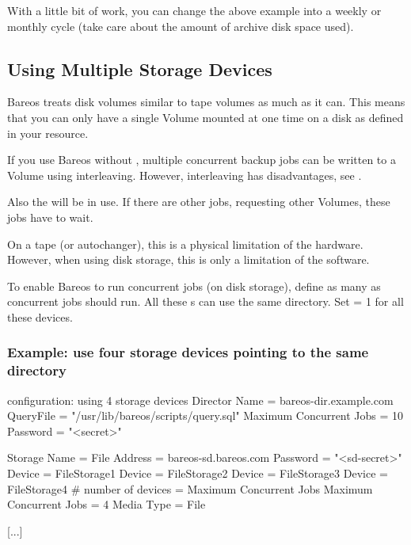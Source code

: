 With a little bit of work, you can change the above example into a weekly or
monthly cycle (take care about the amount of archive disk space used).



\subsection{Using Multiple Storage Devices}

Bareos treats disk volumes similar to tape volumes as much as it can.
This means that you can only have a single Volume mounted at one time on a disk as defined in your  resource.

If you use Bareos without ,
multiple concurrent backup jobs can be written to a Volume using interleaving.
However, interleaving has disadvantages, see .

Also the  will be in use. If there are other jobs, requesting other Volumes,
these jobs have to wait.

On a tape (or autochanger), this is a physical limitation of the hardware.
However, when using disk storage, this is only a limitation of the software.

To enable Bareos to run concurrent jobs (on disk storage), define as many  as concurrent jobs should run.
All these s can use the same  directory. Set  = 1 for all these devices.

\subsubsection{Example: use four storage devices pointing to the same directory}

\begin{bconfig}{\bareosDir configuration: using 4 storage devices}
Director {
  Name = bareos-dir.example.com
  QueryFile = "/usr/lib/bareos/scripts/query.sql"
  Maximum Concurrent Jobs = 10
  Password = "<secret>"
}

Storage {
  Name = File
  Address = bareos-sd.bareos.com
  Password = "<sd-secret>"
  Device = FileStorage1
  Device = FileStorage2
  Device = FileStorage3
  Device = FileStorage4
  # number of devices = Maximum Concurrent Jobs
  Maximum Concurrent Jobs = 4
  Media Type = File
}

[...]
\end{bconfig}


